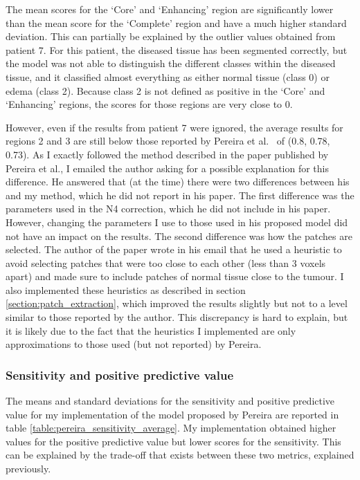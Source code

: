 \documentclass[12pt,a4paper,twoside,openright]{report}
\begin{document}
The mean scores for the `Core' and `Enhancing' region are significantly lower than the mean score for the `Complete' region and have a much higher standard deviation. This can partially be explained by the outlier values obtained from patient 7. For this patient, the diseased tissue has been segmented correctly, but the model was not able to distinguish the different classes within the diseased tissue, and it classified almost everything as either normal tissue (class 0) or edema (class 2). Because class 2 is not defined as positive in the `Core' and `Enhancing' regions, the scores for those regions are very close to 0.  

However, even if the results from patient 7 were ignored, the average results for regions 2 and 3 are still below those reported by Pereira et al.\ \cite{pereira} of (0.8, 0.78, 0.73). As I exactly followed the method described in the paper published by Pereira et al., I emailed the author asking for a possible explanation for this difference. He answered that (at the time) there were two differences between his and my method, which he did not report in his paper. The first difference was the parameters used in the N4 correction, which he did not include in his paper. However, changing the parameters I use to those used in his proposed model did not have an impact on the results. The second difference was how the patches are selected. The author of the paper wrote in his email that he used a heuristic to avoid selecting patches that were too close to each other (less than 3 voxels apart) and made sure to include patches of normal tissue close to the tumour. I also implemented these heuristics as described in section \ref{section:patch_extraction}, which improved the results slightly but not to a level similar to those reported by the author. This discrepancy is hard to explain, but it is likely due to the fact that the heuristics I implemented are only approximations to those used (but not reported) by Pereira.

\subsubsection{Sensitivity and positive predictive value}
The means and standard deviations for the sensitivity and positive predictive value for my implementation of the model proposed by Pereira are reported in table \ref{table:pereira_sensitivity_average}. My implementation obtained higher values for the positive predictive value but lower scores for the sensitivity. This can be explained by the trade-off that exists between these two metrics, explained previously.
\end{document}
